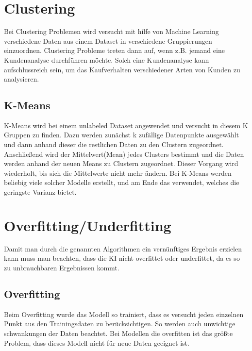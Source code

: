 \section{Clustering}
\label{sec:clustering}
Bei Clustering Problemen wird versucht mit hilfe von Machine Learning verschiedene Daten aus einem Dataset in verschiedene Gruppierungen einzuordnen.\cite[p.~5.]{WML} Clustering Probleme treten dann auf, wenn z.B. jemand eine Kundenanalyse durchführen möchte. Solch eine Kundenanalyse kann aufschlussreich sein, um das Kaufverhalten verschiedener Arten von Kunden zu analysieren.


\subsection{K-Means}
\label{sec:kMeans}
K-Means wird bei einem unlabeled Dataset angewendet und versucht in diesem K Gruppen zu finden. Dazu werden zunächst k zufällige Datenpunkte ausgewählt und dann anhand dieser die restlichen Daten zu den Clustern zugeordnet. Anschließend wird der Mittelwert(Mean) jedes Clusters bestimmt und die Daten werden anhand der neuen Means zu Clustern zugeordnet. Dieser Vorgang wird wiederholt, bis sich die Mittelwerte nicht mehr ändern. Bei K-Means werden beliebig viele solcher Modelle erstellt, und am Ende das verwendet, welches die geringste Varianz bietet.\cite[p.~222.]{WML}


\section{Overfitting/Underfitting}
\label{sec:overfittingUnderfitting}
Damit man durch die genannten Algorithmen ein vernünftiges Ergebnis erzielen kann muss man beachten, dass die KI nicht overfittet oder underfittet, da es so zu unbrauchbaren Ergebnissen kommt.


\subsection{Overfitting}
\label{sec:overfitting}
Beim Overfitting wurde das Modell so trainiert, dass es versucht jeden einzelnen Punkt aus den Trainingsdaten zu berücksichtigen. So werden auch unwichtige schwankungen der Daten beachtet. Bei Modellen die overfitten ist das größte Problem, dass dieses Modell nicht für neue Daten geeignet ist.\cite[p.~214.]{WML}



